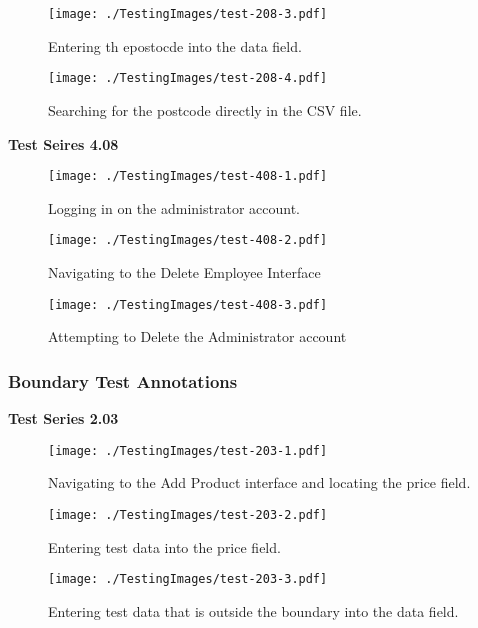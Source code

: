 \begin{figure}[H]
    \texttt{[image: ./TestingImages/test-208-3.pdf]}
    \caption{Entering th epostocde into the data field.}  \label{fig:test-208-3}
\end{figure}

\begin{figure}[H]
    \texttt{[image: ./TestingImages/test-208-4.pdf]}
    \caption{Searching for the postcode directly in the CSV file.}  \label{fig:test-208-4}
\end{figure}

\textbf{Test Seires 4.08}

\begin{figure}[H]
    \texttt{[image: ./TestingImages/test-408-1.pdf]}
    \caption{Logging in on the administrator account.}  \label{fig:test-408-1}
\end{figure}

\begin{figure}[H]
    \texttt{[image: ./TestingImages/test-408-2.pdf]}
    \caption{Navigating to the Delete Employee Interface}  \label{fig:test-408-2}
\end{figure}

\begin{figure}[H]
    \texttt{[image: ./TestingImages/test-408-3.pdf]}
    \caption{Attempting to Delete the Administrator account}  \label{fig:test-408-3}
\end{figure}

\pagebreak

\subsubsection{Boundary Test Annotations}

\textbf{Test Series 2.03}

\begin{figure}[H]
    \texttt{[image: ./TestingImages/test-203-1.pdf]}
    \caption{Navigating to the Add Product interface and locating the price field.}  \label{fig:test-203-1}
\end{figure}

\begin{figure}[H]
    \texttt{[image: ./TestingImages/test-203-2.pdf]}
    \caption{Entering test data into the price field.}  \label{fig:test-203-2}
\end{figure}

\begin{figure}[H]
    \texttt{[image: ./TestingImages/test-203-3.pdf]}
    \caption{Entering test data that is outside the boundary into the data field.}  \label{fig:test-203-3}
\end{figure}

